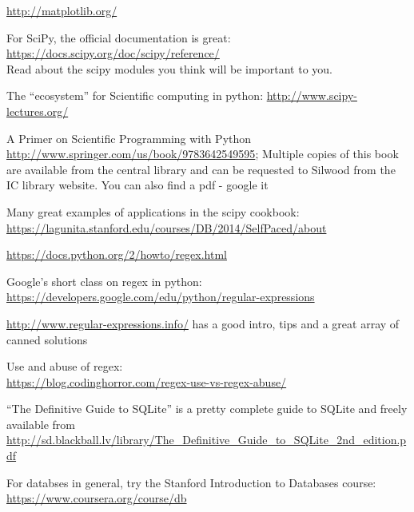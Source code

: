 \begin{compactitem} \itemsep6pt
	\item \url{http://matplotlib.org/}
	\item For SciPy, the official documentation is great:\\
\url{https://docs.scipy.org/doc/scipy/reference/}\\
	Read about the scipy modules you think will be important to you. 
	
	\item The ``ecosystem'' for Scientific computing in python: 
	\url{http://www.scipy-lectures.org/}

	\item A Primer on Scientific Programming with Python 
	\url{http://www.springer.com/us/book/9783642549595}; 
	Multiple copies of this book are available from the central library 
	and can be requested to Silwood from the IC library website. 
	You can also find a pdf - google it

	\item Many great examples of applications in the scipy cookbook:
	\url{https://lagunita.stanford.edu/courses/DB/2014/SelfPaced/about}

	\item \url{https://docs.python.org/2/howto/regex.html}
	\item Google's short class on regex in python:\\
	\url{https://developers.google.com/edu/python/regular-expressions}
	\item \url{http://www.regular-expressions.info/} has a good intro, tips and 
	a great array of canned solutions
	\item Use and abuse of regex:\\ 
\url{https://blog.codinghorror.com/regex-use-vs-regex-abuse/}   


	\item ``The Definitive Guide to SQLite'' is a pretty complete guide 
	to SQLite and freely available from \url{ 
	http://sd.blackball.lv/library/The_Definitive_Guide_to_SQLite_2nd_edition.pdf}
	\item For databses in general, try the Stanford Introduction to 
	Databases course: \url{https://www.coursera.org/course/db} 

\end{compactitem}
